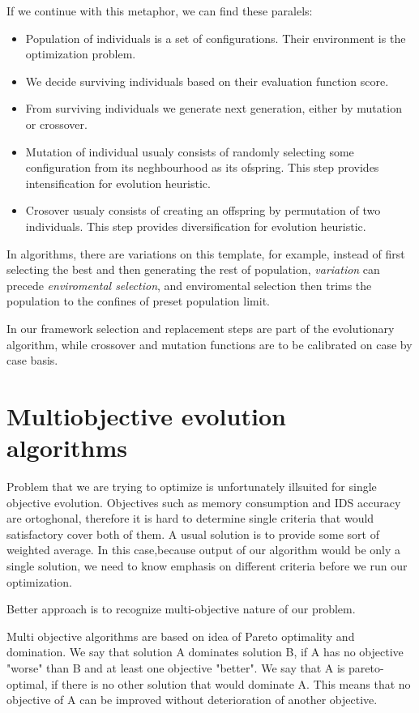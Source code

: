 \documentclass[12pt,oneside]{fithesis2}
\begin{document}
If we continue with this metaphor, we can find these paralels:
\begin{itemize}
\item Population of individuals is a set of configurations. Their environment is the optimization problem.
\item We decide surviving individuals based on their evaluation function score.
\item From surviving individuals we generate next generation, either by mutation or crossover.
\item Mutation of individual usualy consists of randomly selecting some configuration from its neghbourhood as its ofspring. This step provides intensification for evolution heuristic.
\item Crosover usualy consists of creating an offspring by permutation of two individuals. This step provides diversification for evolution heuristic.
\end{itemize}

In algorithms, there are variations on this template, for example, instead of first selecting the best and then generating the rest of population, \emph{variation} can precede \emph{enviromental selection}, and enviromental selection then trims the population to the confines of preset population limit.

In our framework selection and replacement steps are part of the evolutionary algorithm, while crossover and mutation functions are to be calibrated on case by case basis.

\section{Multiobjective evolution algorithms}
Problem that we are trying to optimize is unfortunately illsuited for single objective evolution. Objectives such as memory consumption and IDS accuracy are ortoghonal, therefore it is hard to determine single criteria that would satisfactory cover both of them. A usual solution is to provide some sort of weighted average. In this case,because output of our algorithm would be only a single solution, we need to know emphasis on different criteria before we run our optimization. 

Better approach is to recognize multi-objective nature of our problem.

Multi objective algorithms are based on idea of Pareto optimality and domination. We say that solution A dominates solution B, if A has no objective "worse" than B and at least one objective "better". We say that A is pareto-optimal, if there is no other solution that would dominate A. This means that no objective of A can be improved without deterioration of another objective. 
\end{document}
